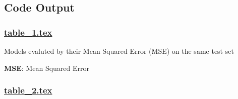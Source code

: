 \documentclass[11pt]{article}
\begin{document}
\subsection{Code Output}

\subsubsection*{\hyperlink{code-LaTeX Table Design-table-1-tex}{table\_1.tex}}

\begin{codeoutput}
\begin{table}[h]
\caption{Comparison of performance between Machine Learning Model (Random Forest) and formula-based method}
\label{table:comparison_of_ML_and_formula_based}
\begin{threeparttable}
\renewcommand{\TPTminimum}{\linewidth}
\begin{tablenotes}
\footnotesize
\item Models evaluted by their Mean Squared Error (MSE) on the same test set
\item \textbf{MSE}: Mean Squared Error
\end{tablenotes}
\end{threeparttable}
\end{table}

\end{codeoutput}

\subsubsection*{\hyperlink{code-LaTeX Table Design-table-2-tex}{table\_2.tex}}
\end{document}
